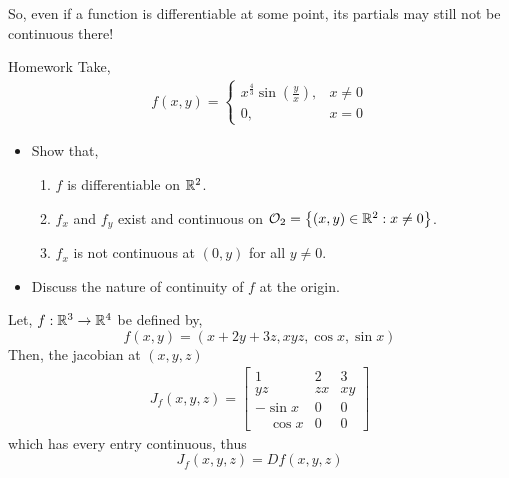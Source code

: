\documentclass[../Analysis-3.tex]{subfiles}
\begin{document}
So, even if a function is differentiable at some point, its partials may still not be continuous there!

\begin{Eg}{Homework}{}
  Take, \begin{align*}
    f(x,y) = \begin{cases}
               x^{\frac{4}{3}}\sin{\left( \frac{y}{x} \right)}, & x \not= 0 \\
               0,                                               & x = 0
             \end{cases}
  \end{align*}
  \begin{itemize}
    \item Show that, \begin{enumerate}
            \item $ f $ is differentiable on $ \mathbb{R}^2 $.
            \item $ f_x $ and $ f_y $ exist and continuous on $ \mathcal{O}_{2} = \left\{ (x,y)\in\mathbb{R}^2 : x \not= 0 \right\} $.
            \item $ f_x $ is not continuous at $ (0,y) $ for all $ y \not= 0 $.
          \end{enumerate}
    \item Discuss the nature of continuity of $ f $ at the origin.
  \end{itemize}
\end{Eg}

\begin{Eg}{}{}
  Let, $ f:\mathbb{R}^3 \to \mathbb{R}^4 $ be defined by, \[ f(x,y) = \left( x+2y+3z, xyz, \cos{x}, \sin{x} \right) \]
  Then, the jacobian at $ (x,y,z) $  \begin{align*}
    J_{f}(x,y,z) = \begin{bmatrix}
                     1             & 2  & 3  \\
                     yz            & zx & xy \\
                     -\sin{x}      & 0  & 0  \\
                     \quad \cos{x} & 0  & 0
                   \end{bmatrix}
  \end{align*}
  which has every entry continuous, thus \[J_{f}(x,y,z) = Df(x,y,z)\]
\end{Eg}
\end{document}
